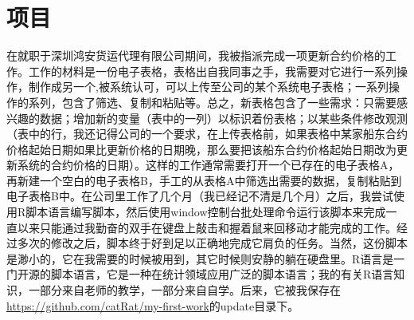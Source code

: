 \section{项目}
在就职于深圳鸿安货运代理有限公司期间，我被指派完成一项更新合约价格的工作。工作的材料是一份电子表格，表格出自我同事之手，我需要对它进行一系列操作，制作成另一个,被系统认可，可以上传至公司的某个系统电子表格；一系列操作的系列，包含了筛选、复制和粘贴等。总之，新表格包含了一些需求：只需要感兴趣的数据；增加新的变量（表中的一列）以标识着份表格；以某些条件修改观测（表中的行，我还记得公司的一个要求，在上传表格前，如果表格中某家船东合约价格起始日期如果比更新价格的日期晚，那么要把该船东合约价格起始日期改为更新系统的合约价格的日期）。这样的工作通常需要打开一个已存在的电子表格A，再新建一个空白的电子表格B，手工的从表格A中筛选出需要的数据，复制粘贴到电子表格B中。在公司里工作了几个月（我已经记不清是几个月）之后，我尝试使用R脚本语言编写脚本，然后使用window控制台批处理命令运行该脚本来完成一直以来只能通过我勤奋的双手在键盘上敲击和握着鼠来回移动才能完成的工作。经过多次的修改之后，脚本终于好到足以正确地完成它肩负的任务。当然，这份脚本是渺小的，它在我需要的时候被用到，其它时候则安静的躺在硬盘里。R语言是一门开源的脚本语言，它是一种在统计领域应用广泛的脚本语言；我的有关R语言知识，一部分来自老师的教学，一部分来自自学。后来，它被我保存在\url{https://github.com/catRat/my-first-work}的update目录下。

